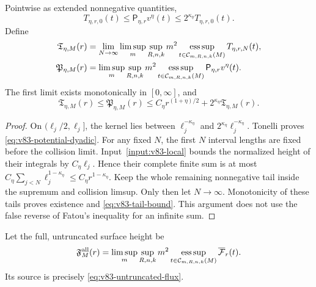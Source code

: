 \begin{lemma}
\label{lem:v83-ordered-tail}
Pointwise as extended nonnegative quantities,
\begin{equation}\label{eq:v83-potential-dyadic}
 T_{\eta,r,0}(t)\le\mathsf P_{\eta,r}v^\eta(t)
                  \le2^{\kappa_\eta}T_{\eta,r,0}(t).
\end{equation}
Define
\begin{align}
 \mathfrak T_{\eta,M}(r)
  &=\lim_{N\to\infty}\limsup_m\sup_{R,n,k}m^2
       \esssup_{t\in\mathcal C_{m,R,n,k}(M)}T_{\eta,r,N}(t),
                                                 \label{eq:v83-tail-height}\\
 \mathfrak P_{\eta,M}(r)
  &=\limsup_m\sup_{R,n,k}m^2
       \esssup_{t\in\mathcal C_{m,R,n,k}(M)}
                                     \mathsf P_{\eta,r}v^\eta(t).
                                                 \label{eq:v83-potential-height}
\end{align}
The first limit exists monotonically in $[0,\infty]$, and
\begin{equation}\label{eq:v83-tail-bound}
 \mathfrak T_{\eta,M}(r)\le\mathfrak P_{\eta,M}(r)
       \le C_\eta r^{(1+\eta)/2}
                            +2^{\kappa_\eta}\mathfrak T_{\eta,M}(r).
\end{equation}
\end{lemma}
\begin{proof}
On $(\ell_j/2,\ell_j]$, the kernel lies between
$\ell_j^{-\kappa_\eta}$ and $2^{\kappa_\eta}\ell_j^{-\kappa_\eta}$.
Tonelli proves \eqref{eq:v83-potential-dyadic}. For any fixed $N$,
the first $N$ interval lengths are fixed before the collision limit.
Input~\ref{input:v83-local} bounds the normalized height of their
integrals by $C_\eta\ell_j$. Hence their complete finite sum is at
most $C_\eta\sum_{j<N}\ell_j^{1-\kappa_\eta}\le
C_\eta r^{1-\kappa_\eta}$. Keep the whole remaining nonnegative
tail inside the supremum and collision limsup. Only then let
$N\to\infty$. Monotonicity of these tails proves existence and
\eqref{eq:v83-tail-bound}. This argument does not use the false
reverse of Fatou's inequality for an infinite sum.
\end{proof}

Let the full, untruncated surface height be
\begin{equation}\label{eq:v83-surface-height}
 \mathfrak F_M^{\rm all}(r)=\limsup_m\sup_{R,n,k}m^2
       \esssup_{t\in\mathcal C_{m,R,n,k}(M)}
                                    \overline{\mathcal F}_r(t).
\end{equation}
Its source is precisely \eqref{eq:v83-untruncated-flux}.

